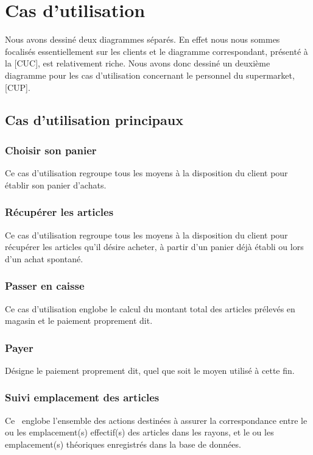 \chapter{Cas d'utilisation}
Nous avons dessiné deux diagrammes séparés.
En effet nous nous sommes focalisés essentiellement sur les clients et le diagramme correspondant, présenté à la [CUC], est relativement riche.
Nous avons donc dessiné un deuxième diagramme pour les cas d'utilisation concernant le personnel du supermarket, [CUP].

\section{Cas d'utilisation principaux}

\subsection{Choisir son panier}
Ce cas d'utilisation regroupe tous les moyens à la disposition du client pour établir son panier d'achats.

\subsection{Récupérer les articles}
Ce cas d'utilisation regroupe tous les moyens à la disposition du client pour récupérer les articles qu'il désire acheter, à partir d'un panier déjà établi ou lors d'un achat spontané.

\subsection{Passer en caisse}
Ce cas d'utilisation englobe le calcul du montant total des articles prélevés en magasin et le paiement proprement dit.

\subsection{Payer}
Désigne le paiement proprement dit, quel que soit le moyen utilisé à cette fin.

\subsection{Suivi emplacement des articles}
Ce \cu\ englobe l'ensemble des actions destinées à assurer la correspondance entre le ou les emplacement(s) effectif(s) des articles dans les rayons, et le ou les emplacement(s) théoriques enregistrés dans la base de données.

